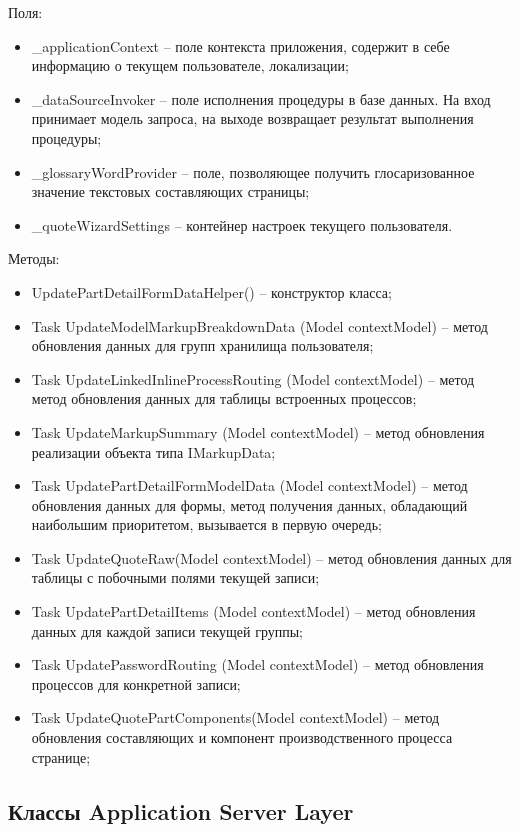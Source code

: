 Поля:
\begin{itemize}
  \item \_applicationContext – поле контекста приложения, содержит в себе информацию о текущем пользователе, локализации;
  \item \_dataSourceInvoker – поле исполнения процедуры в базе данных. На вход принимает модель запроса, на выходе возвращает результат выполнения процедуры;
  \item \_glossaryWordProvider – поле, позволяющее получить глосаризованное значение текстовых составляющих страницы;
  \item \_quoteWizardSettings – контейнер настроек текущего пользователя.
\end{itemize}

Методы:
\begin{itemize}
  \item UpdatePartDetailFormDataHelper() – конструктор класса;
  \item Task UpdateModelMarkupBreakdownData (Model contextModel) – метод обновления данных для групп хранилища пользователя;
  \item Task UpdateLinkedInlineProcessRouting (Model contextModel) – метод метод обновления данных для таблицы встроенных процессов;
  \item Task UpdateMarkupSummary (Model contextModel) – метод обновления реализации объекта типа IMarkupData;
  \item Task UpdatePartDetailFormModelData (Model contextModel) – метод обновления данных для формы, метод получения данных, обладающий наибольшим приоритетом, вызывается в первую очередь;
  \item Task UpdateQuoteRaw(Model contextModel) – метод обновления данных для таблицы с побочными полями текущей записи;
  \item Task UpdatePartDetailItems (Model contextModel) – метод обновления данных для каждой записи текущей группы;
  \item Task UpdatePasswordRouting (Model contextModel) – метод обновления процессов для конкретной записи;
  \item Task UpdateQuotePartComponents(Model contextModel) – метод обновления составляющих и компонент производственного процесса странице;
\end{itemize}

\subsection{Классы Application Server Layer}
\label{sub:arch_and_mod:application_server_layer}

